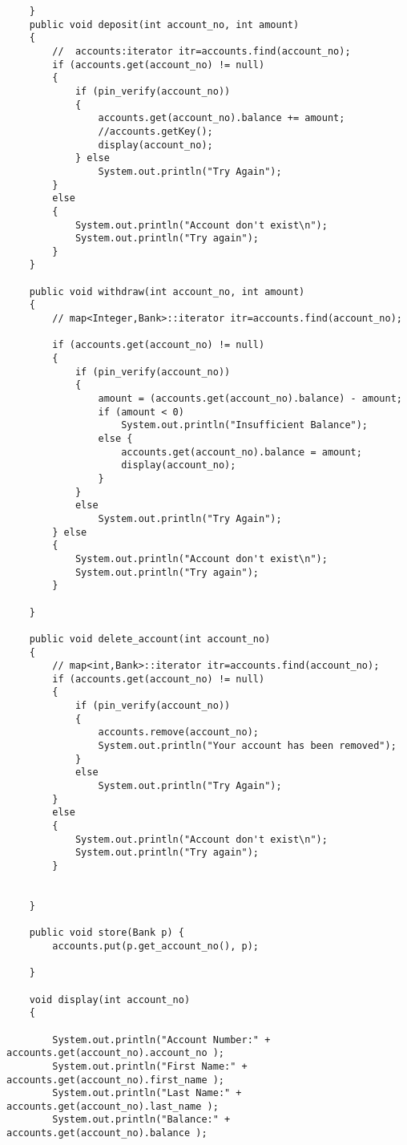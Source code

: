 \documentclass[11pt, a4paper]{article}
\begin{document}
\begin{lstlisting}
    }
    public void deposit(int account_no, int amount)
    {
        //  accounts:iterator itr=accounts.find(account_no);
        if (accounts.get(account_no) != null)
        {
            if (pin_verify(account_no))
            {
                accounts.get(account_no).balance += amount;
                //accounts.getKey();
                display(account_no);
            } else
                System.out.println("Try Again");
        }
        else
        {
            System.out.println("Account don't exist\n");
            System.out.println("Try again");
        }
    }

    public void withdraw(int account_no, int amount)
    {
        // map<Integer,Bank>::iterator itr=accounts.find(account_no);

        if (accounts.get(account_no) != null)
        {
            if (pin_verify(account_no))
            {
                amount = (accounts.get(account_no).balance) - amount;
                if (amount < 0)
                    System.out.println("Insufficient Balance");
                else {
                    accounts.get(account_no).balance = amount;
                    display(account_no);
                }
            }
            else
                System.out.println("Try Again");
        } else
        {
            System.out.println("Account don't exist\n");
            System.out.println("Try again");
        }

    }

    public void delete_account(int account_no)
    {
        // map<int,Bank>::iterator itr=accounts.find(account_no);
        if (accounts.get(account_no) != null)
        {
            if (pin_verify(account_no))
            {
                accounts.remove(account_no);
                System.out.println("Your account has been removed");
            }
            else
                System.out.println("Try Again");
        }
        else
        {
            System.out.println("Account don't exist\n");
            System.out.println("Try again");
        }


    }

    public void store(Bank p) {
        accounts.put(p.get_account_no(), p);

    }

    void display(int account_no)
    {

        System.out.println("Account Number:" + accounts.get(account_no).account_no );
        System.out.println("First Name:" + accounts.get(account_no).first_name );
        System.out.println("Last Name:" + accounts.get(account_no).last_name );
        System.out.println("Balance:" + accounts.get(account_no).balance );


\end{lstlisting}
\end{document}
